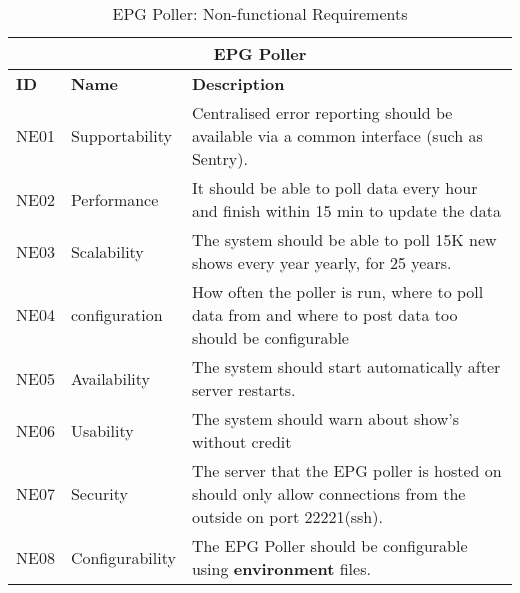 \begin{table}
    \begin{tabular}{|p{1cm}|p{3.5cm}|p{11cm}|} 
        \hline
        \multicolumn{3}{|c|}{\textbf{EPG Poller}} \\
        \hline
        \textbf{ID} & \textbf{Name} & \textbf{Description} \\
        \hline
        NE01 & Supportability &  Centralised error reporting should be available via a common interface (such as Sentry).\\
        \hline
        NE02 & Performance &  It should be able to poll data every hour and finish within 15 min to update the data \\
        \hline
        NE03 & Scalability &  The system should be able to poll 15K new shows every year yearly, for 25 years. \\
        \hline
        NE04 & configuration & How often the poller is run, where to poll data from and where to post data too should be configurable \\
        \hline
        NE05 & Availability &  The system should start automatically after server restarts. \\
        \hline
        NE06 & Usability & The system should warn about show's without credit \\
        \hline
        NE07 & Security & The server that the EPG poller is hosted on should only allow connections from the outside on port 22221(ssh). \\
        \hline
        NE08 & Configurability & The EPG Poller should be configurable using \textbf{environment} files. \\
        \hline
    \end{tabular}
    \caption{EPG Poller: Non-functional Requirements}
    \label{tab:epg_poller_nfunreq}
\end{table}